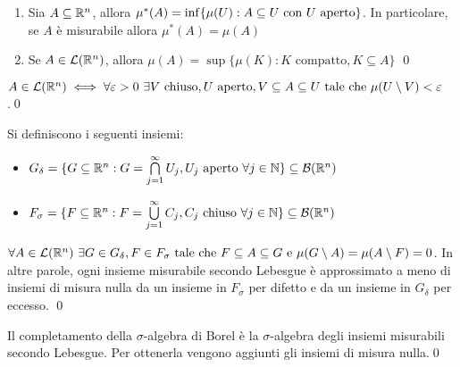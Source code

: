 \begin{theorem}\leavevmode
	\begin{enumerate}
		\item Sia $A\subseteq\mathbb{R}^n$, allora $\mu^*(A)=\inf\{\mu(U):A\subseteq U \text{ con } U \text{ aperto}\}$. In particolare, se $A$ è misurabile allora $\mu^*(A)=\mu(A)$
		\item Se $A \in \mathcal{L}(\mathbb{R}^n)$, allora $\mu(A)=\sup\{\mu(K):K \text{ compatto}, K \subseteq A\}$
		\qed
	\end{enumerate}
\end{theorem}

\begin{corollary}
	$A \in \mathcal{L}(\mathbb{R}^n) \iff \forall \varepsilon > 0 \ \exists V \text{ chiuso}, U \text{ aperto}, V \subseteq A \subseteq U \text{ tale che } \mu(U\setminus V) < \varepsilon$.\qed
\end{corollary}

\begin{definition}
	Si definiscono i seguenti insiemi:
	\begin{itemize}
		\item $G_\delta = \{G \subseteq \mathbb{R}^n:G=\bigcap\limits_{j=1}^\infty U_j, U_j \text{ aperto } \forall j \in \mathbb{N}\} \subseteq \mathcal{B}(\mathbb{R}^n)$
		\item $F_\sigma = \{F \subseteq \mathbb{R}^n:F=\bigcup\limits_{j=1}^\infty C_j, C_j \text{ chiuso } \forall j \in \mathbb{N}\} \subseteq \mathcal{B}(\mathbb{R}^n)$
	\end{itemize}
\end{definition}

\begin{theorem}
	$\forall A \in \mathcal{L}(\mathbb{R}^n) \ \exists G \in G_\delta, F \in F_\sigma \text{ tale che } F \subseteq A \subseteq G \text{ e } \mu(G\setminus A)=\mu(A\setminus F)=0$. In altre parole, ogni insieme misurabile secondo Lebesgue è approssimato a meno di insiemi di misura nulla da un insieme in $F_\sigma$ per difetto e da un insieme in $G_\delta$ per eccesso.
	\qed
\end{theorem}

\begin{corollary}
	Il completamento della $\sigma$-algebra di Borel è la $\sigma$-algebra degli insiemi misurabili secondo Lebesgue. Per ottenerla vengono aggiunti gli insiemi di misura nulla.\qed
\end{corollary}

